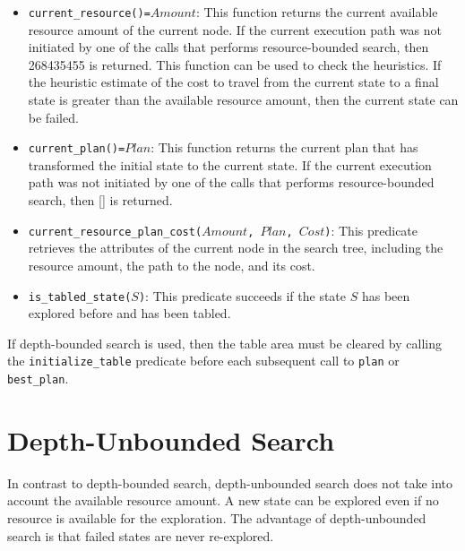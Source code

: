 \begin{itemize}
\item \texttt{current\_resource()=$Amount$}: This function returns the current available resource amount of the current node. If the current execution path was not initiated by one of the calls that performs resource-bounded search, then 268435455 is returned. This function can be used to check the heuristics. If the heuristic estimate of the cost to travel from the current state to a final state is greater than the available resource amount, then the current state can be failed.

\item \texttt{current\_plan()=$Plan$}: This function returns the current plan that has transformed the initial state to the current state. If the current execution path was not initiated by one of the calls that performs resource-bounded search, then [] is returned.

\item \texttt{current\_resource\_plan\_cost($Amount$, $Plan$, $Cost$)}: This predicate retrieves the attributes of the current node in the search tree, including the resource amount, the path to the node, and its cost.

\item \texttt{is\_tabled\_state($S$)}: This predicate succeeds if the state $S$ has been explored before and has been tabled.
\end{itemize}

If depth-bounded search is used, then the table area must be cleared by calling the \newline \texttt{initialize\_table} predicate before each subsequent call to \texttt{plan} or \texttt{best\_plan}.

\section{Depth-Unbounded Search}
In contrast to depth-bounded search, depth-unbounded search does not take into account the available resource amount. A new state can be explored even if no resource is available for the exploration. The advantage of depth-unbounded search is that failed states are never re-explored.

